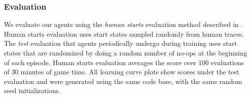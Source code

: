 \documentclass[a4paper]{article}
\begin{document}
\begin{table*}[!hp]
\centering


\caption{
\label{tab-atari-best-agent-hyperparameters}
Chosen hyperparameters for prioritized variants of DQN.  Arrows indicate linear annealing, where the limiting value is reached at the end of training.  Note the rank-based variant with DQN as the baseline is an early version without IS.  Here, the bias introduced by prioritized replay was instead corrected by annealing $\alpha$ to zero.
}
\end{table*}


\subsubsection{Evaluation}
\label{sec-evaluation}

We evaluate our agents using the \emph{human starts} evaluation method described in \citep{double-dqn}.  Human starts evaluation uses start states sampled randomly from human traces.  The \emph{test} evaluation that agents periodically undergo during training uses start states that are randomized by doing a random number of no-ops at the beginning of each episode.  Human starts evaluation averages the score over 100 evaluations of 30 minutes of game time.  All learning curve plots show scores under the test evaluation and were generated using the same code base, with the same random seed initializations.
\end{document}
